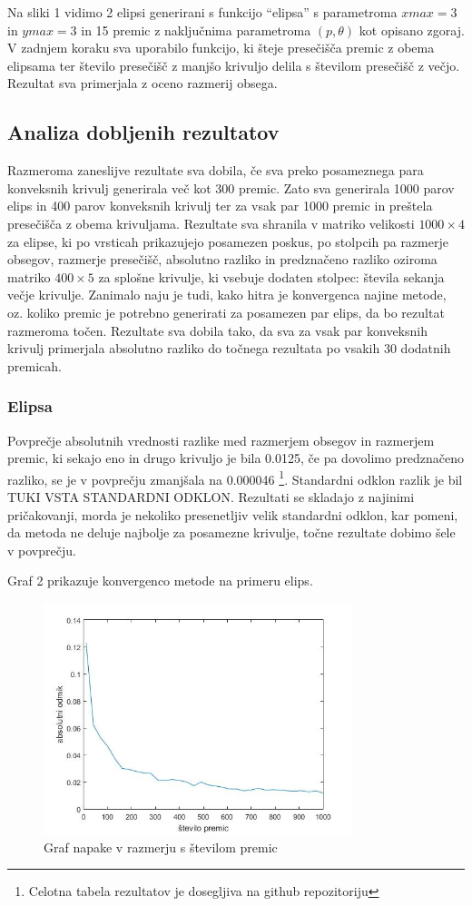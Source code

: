 \documentclass[a4paper]{article}
\begin{document}
Na sliki 1 vidimo 2 elipsi generirani s funkcijo ``elipsa'' s parametroma $xmax=3$ in $ymax=3$ in 15 premic z naključnima parametroma $(p, \theta)$ kot opisano zgoraj. V zadnjem koraku sva uporabilo funkcijo, ki šteje presečišča premic z obema elipsama ter število presečišč z manjšo krivuljo delila s številom presečišč z večjo. Rezultat sva primerjala z oceno razmerij obsega. 




\subsection{Analiza dobljenih rezultatov}
Razmeroma zaneslijve rezultate sva dobila, če sva preko posameznega para konveksnih krivulj generirala več kot 300 premic. Zato sva generirala 1000 parov elips in 400 parov konveksnih krivulj ter za vsak par 1000 premic in preštela presečišča z obema krivuljama. Rezultate sva shranila v matriko velikosti $1000 \times 4$ za elipse, ki po vrsticah prikazujejo posamezen poskus, po stolpcih pa razmerje obsegov, razmerje presečišč, absolutno razliko in predznačeno razliko oziroma matriko $400 \times 5$ za splošne krivulje, ki vsebuje dodaten stolpec: števila sekanja večje krivulje. 
Zanimalo naju je tudi, kako hitra je konvergenca najine metode, oz. koliko premic je potrebno generirati za posamezen par elips, da bo rezultat razmeroma točen. Rezultate sva dobila tako, da sva za vsak par konveksnih krivulj primerjala absolutno razliko do točnega rezultata po vsakih 30 dodatnih premicah. 


\subsubsection{Elipsa}
Povprečje absolutnih vrednosti razlike med razmerjem obsegov in razmerjem premic, ki sekajo eno in drugo krivuljo je bila 0.0125, če pa dovolimo predznačeno razliko, se je v povprečju zmanjšala na 0.000046 \footnote[1]{Celotna tabela rezultatov je dosegljiva na github repozitoriju}. Standardni odklon razlik je bil TUKI VSTA STANDARDNI ODKLON. Rezultati se skladajo z najinimi pričakovanji, morda je nekoliko presenetljiv velik standardni odklon, kar pomeni, da metoda ne deluje najbolje za posamezne krivulje, točne rezultate dobimo šele v povprečju.

Graf 2 prikazuje konvergenco metode na primeru elips.

\begin{figure}[h]
\centering
\includegraphics[width=90mm]{graf_elipsa2.jpg}
\caption{Graf napake v razmerju s številom premic \label{overflow}}
\end{figure} 
\end{document}
